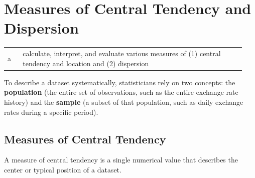 
\section{Measures of Central Tendency and Dispersion}
\label{sec:Measures of Central Tendency and Dispersion}
\begin{center}
\begin{tabular}{p{0.06\linewidth} | p{0.88\linewidth}}
	a & calculate, interpret, and evaluate various measures of (1) central tendency and location and (2) dispersion \\
\end{tabular}
\end{center}

To describe a dataset systematically, statisticians rely on two concepts: the \textbf{population} (the entire set of observations, such as the entire exchange rate history) and the \textbf{sample} (a subset of that population, such as daily exchange rates during a specific period).

\subsection{Measures of Central Tendency}
	\label{subsec:Measures of Central Tendency}
A measure of central tendency is a single numerical value that describes the center or typical position of a dataset.

